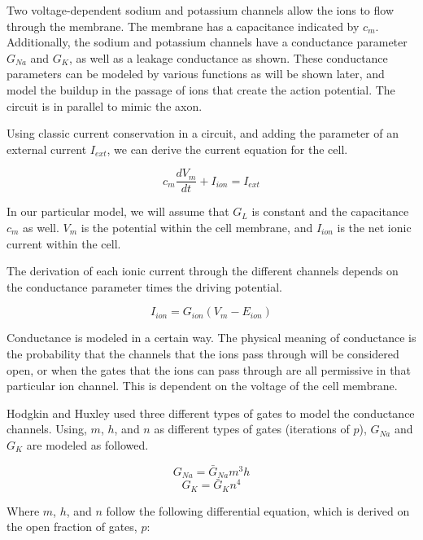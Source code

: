 \documentclass{article}
\begin{document}
Two voltage-dependent sodium and potassium channels allow the ions to flow through the membrane. The membrane has a capacitance indicated by $c_m$. Additionally, the sodium and potassium channels have a conductance parameter $G_{Na}$ and $G_K$, as well as a leakage conductance as shown. These conductance parameters can be modeled by various functions as will be shown later, and model the buildup in the passage of ions that create the action potential. The circuit is in parallel to mimic the axon. 

Using classic current conservation in a circuit, and adding the parameter of an external current $I_{ext}$, we can derive the current equation for the cell.

\begin{equation}
    c_m\frac{dV_m}{dt} + I_{ion} = I_{ext}
\end{equation}

In our particular model, we will assume that $G_L$ is constant and the capacitance $c_m$ as well. $V_m$ is the potential within the cell membrane, and $I_{ion}$ is the net ionic current within the cell.

The derivation of each ionic current through the different channels depends on the conductance parameter times the driving potential.

\begin{equation}
    I_{ion} = G_{ion}(V_{m}-E_{ion})
\end{equation}

Conductance is modeled in a certain way. The physical meaning of conductance is the probability that the channels that the ions pass through will be considered open, or when the gates that the ions can pass through are all permissive in that particular ion channel. This is dependent on the voltage of the cell membrane. 

Hodgkin and Huxley used three different types of gates to model the conductance channels. Using, $m$, $h$, and $n$ as different types of gates (iterations of $p$), $G_{Na}$ and $G_K$ are modeled as followed.

\begin{equation}
    G_{Na} = \bar{G}_{Na}m^3h
\end{equation}
\begin{equation}
    G_{K} = \bar{G}_{K}n^4
\end{equation}

Where $m$, $h$, and $n$ follow the following differential equation, which is derived on the open fraction of gates, $p$:
\end{document}
